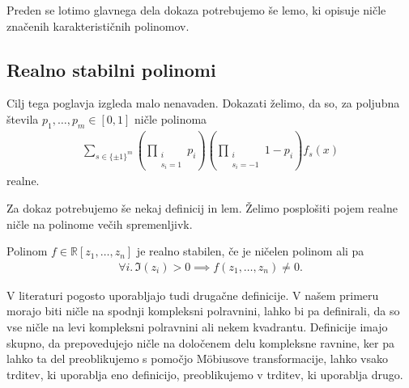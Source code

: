 Preden se lotimo glavnega dela dokaza potrebujemo še lemo, ki opisuje ničle značenih karakterističnih polinomov.

\subsection{Realno stabilni polinomi}
Cilj tega poglavja izgleda malo nenavaden. Dokazati želimo, da so, za poljubna števila \(p_1, \ldots, p_m \in [0,1]\) ničle polinoma
\begin{align*}
    \sum_{s\in \{\pm 1\}^m} \left(\prod_{\substack{i\\s_i=1}} p_i\right) \left(\prod_{\substack{i\\s_i=-1}} 1- p_i\right) f_s(x)
\end{align*}
realne.

Za dokaz potrebujemo še nekaj definicij in lem. Želimo posplošiti pojem realne ničle na polinome večih spremenljivk.
\begin{definicija}
    Polinom \(f\in \mathbb R[z_1, \ldots, z_n]\) je realno stabilen, če je ničelen polinom ali pa
    \begin{align*}
        \forall i.\, \Im(z_i) > 0 \implies f(z_1, \ldots, z_n) \neq 0.
    \end{align*}
\end{definicija}
V literaturi pogosto uporabljajo tudi drugačne definicije. V našem primeru morajo biti ničle na spodnji kompleksni polravnini, lahko bi pa definirali, da so vse ničle na levi kompleksni polravnini ali nekem kvadrantu. Definicije imajo skupno, da prepovedujejo ničle na določenem delu kompleksne ravnine, ker pa lahko ta del preoblikujemo s pomočjo Möbiusove transformacije, lahko vsako trditev, ki uporablja eno definicijo, preoblikujemo v trditev, ki uporablja drugo\cite{mckenzie}.


